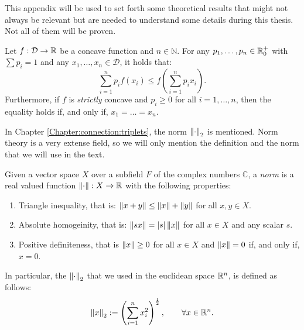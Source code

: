 \label{APPENDIX:A}

This appendix will be used to set forth some theoretical results that might not always be relevant but are needed to understand some details during this thesis. Not all of them will be proven.

\begin{nprop}\label{prop:jensen}
    Let $f:\mathcal D \to \mathbb{R}$ be a concave function and $n\in \mathbb N$. For any $p_1,\dots,p_n \in \mathbb{R}^+_0$ with $\sum p_i = 1$ and any $x_1,\dots,x_n \in \mathcal D$, it holds that:
    $$
    \sum_{i = 1}^n p_i f(x_i) \leq f \left(\sum_{i=1}^n p_i x_i\right).
    $$
    Furthermore, if $f$ is \emph{strictly} concave and $p_i \geq 0$ for all $i  = 1,\dots,n$, then the equality holds if, and only if, $x_1 = \dots = x_n$.
\end{nprop}

In Chapter \ref{Chapter:connection:triplets}, the norm $\left\lVert\cdot\right\rVert_2$ is mentioned. Norm theory is a very extense field, so we will only mention the definition and the norm that we will use in the text.

\begin{ndef}\label{def:norm}
Given a vector space $X$ over a subfield $F$ of the complex numbers $\mathbb C$, a \emph{norm} is a real valued function $\left\lVert\cdot\right\rVert:X \to \mathbb{R}$ with the following properties:
\begin{enumerate}
\item Triangle inequality, that is: $\left\lVert x+y\right\rVert \leq \left\lVert x\right\rVert + \left\lVert y\right\rVert$ for all $x,y \in X$.
\item Absolute homogeinity, that is: $\left\lVert sx\right\rVert = \left\lvert s\right\rvert\left\lVert x\right\rVert$ for all $x\in X$ and any scalar $s$.
\item Positive definiteness, that is $\left\lVert x\right\rVert \geq 0 $ for all $x \in X$ and $\left\lVert x\right\rVert = 0$ if, and only if, $x = 0$.
\end{enumerate}
\end{ndef}
In particular, the $\left\lVert\cdot\right\rVert_2$ that we used in the euclidean space $\mathbb{R}^n$, is defined as follows:
\[
\left\lVert x\right\rVert_2 := \left(\sum_{i = 1}^n x_i^2\right)^{\frac{1}{2}}, \quad \quad \forall x \in \mathbb{R}^n.     
\]
